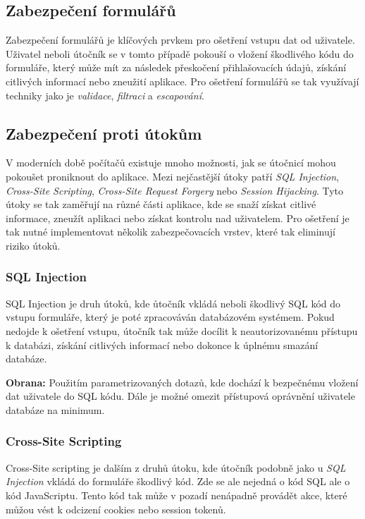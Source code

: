\subsection{Zabezpečení formulářů}
\label{subsec:security-forms}
Zabezpečení formulářů je klíčových prvkem pro ošetření vstupu dat od uživatele. Uživatel neboli útočník se v tomto případě pokouší o vložení škodlivého kódu do formuláře, který může mít za následek přeskočení přihlašovacích údajů, získání citlivých informací nebo zneužití aplikace. Pro ošetření formulářů se tak využívají techniky jako je \textit{validace}, \textit{filtraci} a \textit{escapování}.

\subsection{Zabezpečení proti útokům}
\label{subsec:security-attacks}
V moderních době počítačů existuje mnoho možnosti, jak se útočnicí mohou pokoušet proniknout do aplikace. Mezi nejčastější útoky patří \textit{SQL Injection}, \textit{Cross-Site Scripting}, \textit{Cross-Site Request Forgery} nebo \textit{Session Hijacking}. Tyto útoky se tak zaměřují na různé části aplikace, kde se snaží získat citlivé informace, zneužít aplikaci nebo získat kontrolu nad uživatelem. Pro ošetření je tak nutné implementovat několik zabezpečovacích vrstev, které tak eliminují riziko útoků.

\subsubsection*{SQL Injection}
\label{subsubsec:security-attacks-sql-injection}
SQL Injection je druh útoků, kde ůtočník vkládá neboli  škodlivý SQL kód do vstupu formuláře, který je poté zpracováván databázovém systémem. Pokud nedojde k ošetření vstupu, útočník tak může docílit k neautorizovanému přístupu k databázi, získání citlivých informací nebo dokonce k úplnému smazání databáze.

\textbf{Obrana:} Použitím parametrizovaných dotazů, kde dochází k bezpečnému vložení dat uživatele do SQL kódu. Dále je možné omezit přístupová oprávnění uživatele databáze na minimum.

\subsubsection*{Cross-Site Scripting}
\label{subsubsec:security-attacks-cross-site-scripting}
Cross-Site scripting je dalším z druhů útoku, kde útočník podobně jako u \textit{SQL Injection} vkládá do formuláře škodlivý kód. Zde se ale nejedná o kód SQL ale o kód JavaScriptu. Tento kód tak může v pozadí nenápadně provádět akce, které můžou vést k odcizení cookies nebo session tokenů.

